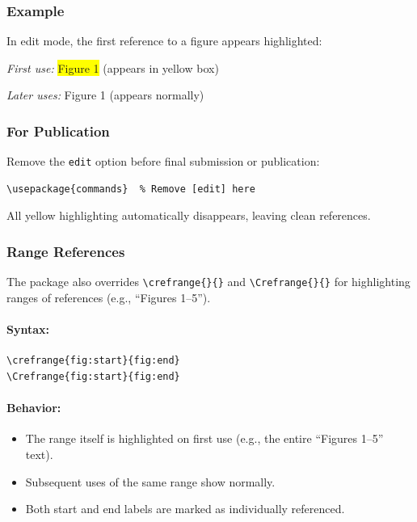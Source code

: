 \documentclass[11pt]{article}
\begin{document}
\subsubsection{Example}

In edit mode, the first reference to a figure appears highlighted:

\textit{First use:} \colorbox{yellow}{Figure 1}  (appears in yellow box)

\textit{Later uses:} Figure 1 (appears normally)

\subsubsection{For Publication}

Remove the \verb|edit| option before final submission or publication:

\begin{verbatim}
\usepackage{commands}  % Remove [edit] here
\end{verbatim}

All yellow highlighting automatically disappears, leaving clean references.

\subsubsection{Range References}

The package also overrides \verb|\crefrange{}{}| and \verb|\Crefrange{}{}| 
for highlighting ranges of references (e.g., ``Figures 1--5'').

\paragraph{Syntax:}
\begin{verbatim}
\crefrange{fig:start}{fig:end}
\Crefrange{fig:start}{fig:end}
\end{verbatim}

\paragraph{Behavior:}
\begin{itemize}
  \item The range itself is highlighted on first use (e.g., the entire ``Figures 1--5'' text).
  \item Subsequent uses of the same range show normally.
  \item Both start and end labels are marked as individually referenced.
\end{itemize}
\end{document}
